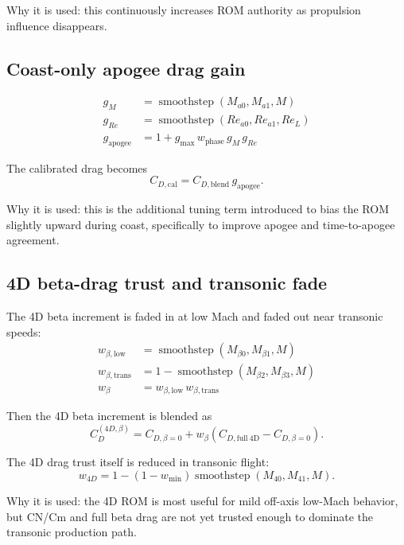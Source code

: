 \documentclass[11pt]{article}
\begin{document}
Why it is used: this continuously increases ROM authority as propulsion influence disappears.

\subsection{Coast-only apogee drag gain}
\begin{align*}
g_M &= \operatorname{smoothstep}(M_{a0}, M_{a1}, M) \\
g_{Re} &= \operatorname{smoothstep}(Re_{a0}, Re_{a1}, Re_L) \\
g_{\mathrm{apogee}} &= 1 + g_{\max}\,w_{\mathrm{phase}}\,g_M\,g_{Re}
\end{align*}

The calibrated drag becomes
\begin{equation*}
C_{D,\mathrm{cal}} = C_{D,\mathrm{blend}}\,g_{\mathrm{apogee}}.
\end{equation*}

Why it is used: this is the additional tuning term introduced to bias the ROM slightly upward during coast, specifically to improve apogee and time-to-apogee agreement.

\subsection{4D beta-drag trust and transonic fade}
The 4D beta increment is faded in at low Mach and faded out near transonic speeds:
\begin{align*}
w_{\beta,\mathrm{low}} &= \operatorname{smoothstep}(M_{\beta 0}, M_{\beta 1}, M) \\
w_{\beta,\mathrm{trans}} &= 1 - \operatorname{smoothstep}(M_{\beta 2}, M_{\beta 3}, M) \\
w_{\beta} &= w_{\beta,\mathrm{low}}\,w_{\beta,\mathrm{trans}}
\end{align*}

Then the 4D beta increment is blended as
\begin{equation*}
C_D^{(4D,\beta)} = C_{D,\beta=0} + w_{\beta}\left(C_{D,\mathrm{full\ 4D}} - C_{D,\beta=0}\right).
\end{equation*}

The 4D drag trust itself is reduced in transonic flight:
\begin{equation*}
w_{4D} = 1 - (1-w_{\min})\operatorname{smoothstep}(M_{40}, M_{41}, M).
\end{equation*}

Why it is used: the 4D ROM is most useful for mild off-axis low-Mach behavior, but CN/Cm and full beta drag are not yet trusted enough to dominate the transonic production path.
\end{document}
